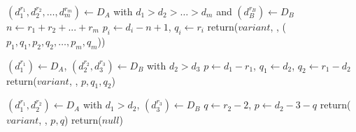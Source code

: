 \documentclass[11pt]{article}
\begin{document}
\begin{algorithm}[H]
\begin{algorithmic}[1]
		                   \STATE  $(d_1^{r_1}, d_2^{r_2}, \dots, d_m^{r_m}) \leftarrow D_A$ with $d_1 > d_2 > \dots > d_m$ and $(d_B^{r_B}) \leftarrow D_B$
		                    \STATE $n \leftarrow r_1 + r_2 + ... + r_m$
                  			 \STATE $p_i \leftarrow d_i - n + 1$, $q_i \leftarrow r_i$
		                       \ENDFOR
		                          \STATE return($variant$, , ($p_1, q_1, p_2, q_2, \dots, p_m, q_m$))
		                        \ENDIF
		            	    \ENDIF
			      \ENDIF	
			
                			\STATE $(d_1^{r_1}) \leftarrow D_A$, $(d_2^{r_2}, d_3^{r_3}) \leftarrow D_B$ with $d_2 > d_3$
			         	\STATE $p \leftarrow d_1 - r_1$, $q_1 \leftarrow d_2$, $q_2 \leftarrow r_1 - d_2$
				                 \STATE return($variant$, , $p, q_1, q_2$)
				                 \ENDIF
				            \ENDIF
				        \ENDIF
		             \ENDIF	
		             
		               \STATE $(d_1^{r_1}, d_2^{r_2}) \leftarrow D_A$ with $d_1 > d_2$, $(d_3^{r_3}) \leftarrow D_B$
		                   \STATE $q \leftarrow r_2 - 2$, $p \leftarrow d_2 - 3 - q$
		           			\STATE return($variant$, , $p, q$)
					\ENDIF
				  \ENDIF
			       \ENDIF
		            \ENDIF         
		\ENDFOR
	\ENDFOR
         \STATE return($null$)
\end{algorithmic}
\end{algorithm}
\end{document}
